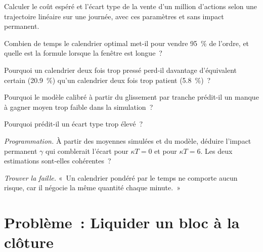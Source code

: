 \begin{exercise}[$\star$]\label{exo:mx:the-almgren-chriss-framework:2}
Calculer le coût espéré et l'écart type de la vente d'un million d'actions selon une trajectoire linéaire sur une journée, avec ces paramètres et sans impact permanent.
\end{exercise}

\begin{exercise}[$\star$]\label{exo:mx:the-almgren-chriss-framework:3}
Combien de temps le calendrier optimal met-il pour vendre 95~\% de l'ordre, et quelle est la formule lorsque la fenêtre est longue~?
\end{exercise}

\begin{exercise}[$\star\star$]\label{exo:mx:the-almgren-chriss-framework:4}
Pourquoi un calendrier deux fois trop pressé perd-il davantage d'équivalent certain (20.9~\%) qu'un calendrier deux fois trop patient (5.8~\%)~?
\end{exercise}

\begin{exercise}[$\star\star$]\label{exo:mx:the-almgren-chriss-framework:5}
Pourquoi le modèle calibré à partir du glissement par tranche prédit-il un manque à gagner moyen trop faible dans la simulation~?
\end{exercise}

\begin{exercise}[$\star\star$]\label{exo:mx:the-almgren-chriss-framework:6}
Pourquoi prédit-il un écart type trop élevé~?
\end{exercise}

\begin{exercise}[$\star\star\star$]\label{exo:mx:the-almgren-chriss-framework:7}
\emph{Programmation.} À partir des moyennes simulées et du modèle, déduire l'impact permanent $\gamma$ qui comblerait l'écart pour $\kappa T=0$ et pour $\kappa T=6$. Les
deux estimations sont-elles cohérentes~?
\end{exercise}

\begin{exercise}[$\star\star\star$]\label{exo:mx:the-almgren-chriss-framework:8}
\emph{Trouver la faille.} «~Un calendrier pondéré par le temps ne comporte aucun risque, car il négocie la même quantité chaque minute.~»
\end{exercise}

\section{Problème~: Liquider un bloc à la clôture}

